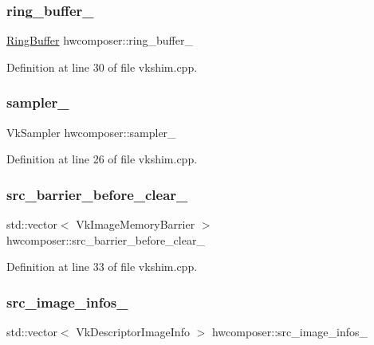 \subsubsection{\texorpdfstring{ring\+\_\+buffer\+\_\+}{ring\_buffer\_}}
{\footnotesize\ttfamily \mbox{\hyperlink{classhwcomposer_1_1RingBuffer}{Ring\+Buffer}} hwcomposer\+::ring\+\_\+buffer\+\_\+}



Definition at line 30 of file vkshim.\+cpp.

\mbox{\label{namespacehwcomposer_a35eda7e12c33bc7d611bdc19b4eee4bb}} 
\subsubsection{\texorpdfstring{sampler\+\_\+}{sampler\_}}
{\footnotesize\ttfamily Vk\+Sampler hwcomposer\+::sampler\+\_\+}



Definition at line 26 of file vkshim.\+cpp.

\mbox{\label{namespacehwcomposer_af73e429b9c07e50ab625f7f54205af77}} 
\subsubsection{\texorpdfstring{src\+\_\+barrier\+\_\+before\+\_\+clear\+\_\+}{src\_barrier\_before\_clear\_}}
{\footnotesize\ttfamily std\+::vector$<$ Vk\+Image\+Memory\+Barrier $>$ hwcomposer\+::src\+\_\+barrier\+\_\+before\+\_\+clear\+\_\+}



Definition at line 33 of file vkshim.\+cpp.

\mbox{\label{namespacehwcomposer_a7eca0feeff5b3292a308fc67388f1497}} 
\subsubsection{\texorpdfstring{src\+\_\+image\+\_\+infos\+\_\+}{src\_image\_infos\_}}
{\footnotesize\ttfamily std\+::vector$<$ Vk\+Descriptor\+Image\+Info $>$ hwcomposer\+::src\+\_\+image\+\_\+infos\+\_\+}



